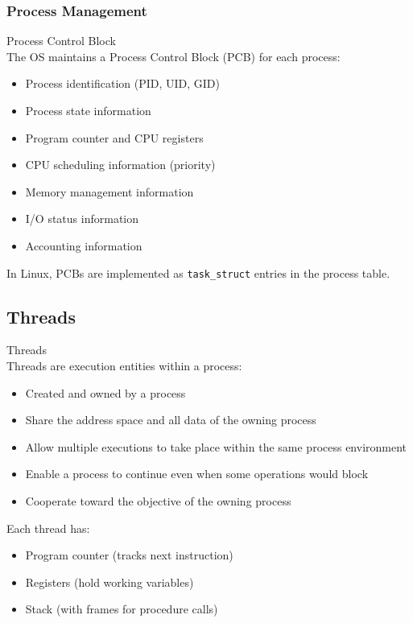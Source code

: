 \subsubsection{Process Management}

\begin{definition}{Process Control Block}\\
    The OS maintains a Process Control Block (PCB) for each process:
    \begin{itemize}
        \item Process identification (PID, UID, GID)
        \item Process state information
        \item Program counter and CPU registers
        \item CPU scheduling information (priority)
        \item Memory management information
        \item I/O status information
        \item Accounting information
    \end{itemize}
    
    In Linux, PCBs are implemented as \texttt{task\_struct} entries in the process table.
\end{definition}

\subsection{Threads}


\begin{definition}{Threads}\\
    Threads are execution entities within a process:
    \begin{itemize}
        \item Created and owned by a process
        \item Share the address space and all data of the owning process
        \item Allow multiple executions to take place within the same process environment
        \item Enable a process to continue even when some operations would block
        \item Cooperate toward the objective of the owning process
    \end{itemize}
    
    Each thread has:
    \begin{itemize}
        \item Program counter (tracks next instruction)
        \item Registers (hold working variables)
        \item Stack (with frames for procedure calls)
    \end{itemize}
\end{definition}

